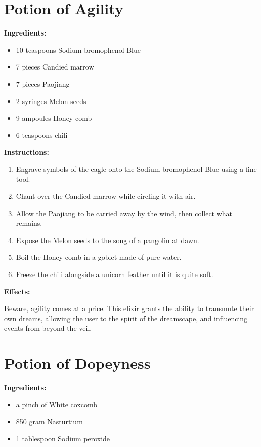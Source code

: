 \documentclass{article}
\begin{document}
\newpage
\section*{Potion of Agility}

\textbf{Ingredients:}

\begin{itemize}
  \item 10 teaspoons Sodium bromophenol Blue
  \item 7 pieces Candied marrow
  \item 7 pieces Paojiang
  \item 2 syringes Melon seeds
  \item 9 ampoules Honey comb
  \item 6 teaspoons chili
\end{itemize}

\textbf{Instructions:}

\begin{enumerate}
  \item Engrave symbols of the eagle onto the Sodium bromophenol Blue using a fine tool.
  \item Chant over the Candied marrow while circling it with air.
  \item Allow the Paojiang to be carried away by the wind, then collect what remains.
  \item Expose the Melon seeds to the song of a pangolin at dawn.
  \item Boil the Honey comb in a goblet made of pure water.
  \item Freeze the chili alongside a unicorn feather until it is quite soft.
\end{enumerate}

\textbf{Effects:}

Beware, agility comes at a price. This elixir grants the ability to transmute their own dreams, allowing the user to the spirit of the dreamscape, and influencing events from beyond the veil.

\newpage
\section*{Potion of Dopeyness}

\textbf{Ingredients:}

\begin{itemize}
  \item a pinch of White coxcomb
  \item 850 gram Nasturtium
  \item 1 tablespoon Sodium peroxide
\end{itemize}
\end{document}
